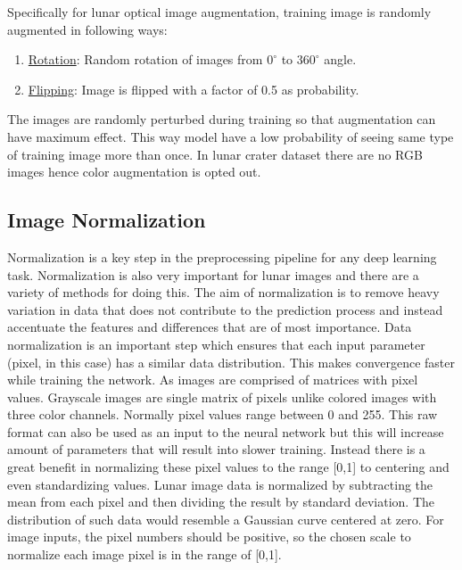 \documentclass[11pt]{article}
\begin{document}
Specifically for lunar optical image augmentation, training image is randomly augmented in following ways:

\begin{enumerate}
	\item \underline{Rotation}: Random rotation of images from $0^{\circ}$ to $360^{\circ}$ angle.
	\item \underline{Flipping}: Image is flipped with a factor of 0.5 as probability. 
\end{enumerate}

The images are randomly perturbed during training so that augmentation can have maximum effect. This way model have a low probability of seeing same type of training image more than once. In lunar crater dataset there are no RGB images hence color augmentation is opted out.

\subsection{Image Normalization}
Normalization is a key step in the preprocessing pipeline for any deep learning task. Normalization is also very important for lunar images and there are a variety of methods for doing this. The aim of normalization is to remove heavy variation in data that does not contribute to the prediction process and instead accentuate the features and differences that
are of most importance. Data normalization is an important step which ensures that each input parameter (pixel, in this case) has a similar data distribution. This makes convergence faster while training the network. As images are comprised of matrices with pixel values. Grayscale images are single matrix of pixels unlike colored images with three color channels. Normally pixel values range between 0 and 255. This raw format can also be used as an input to the neural network but this will increase amount of parameters that will result into slower training. Instead there is a great benefit in normalizing these pixel values to the range [0,1] to centering and even standardizing values. Lunar image data is normalized by subtracting the mean from each pixel and then dividing the result by standard deviation. The distribution of such data would resemble a Gaussian curve centered at zero. For image inputs, the pixel numbers should be positive, so the chosen scale to normalize each image pixel is in the range of [0,1]. 
\end{document}
